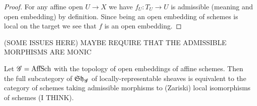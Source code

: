 \documentclass[12pt]{article}
\begin{document}
\begin{proof}
For any affine open $U \to X$ we have $f_U : T_U \to U$ is admissible (meaning and open embedding) by definition. Since being an open embedding of schemes is local on the target we see that $f$ is an open embedding.
\end{proof}

(SOME ISSUES HERE) MAYBE REQUIRE THAT THE ADMISSIBLE MORPHISMS ARE MONIC

\begin{prop}
Let $\mathscr{G} = \mathrm{AffSch}$ with the topology of open embeddings of affine schemes. Then the full subcategory of $\mathfrak{Sh}_{\mathscr{G}}$ of locally-representable sheaves is equivalent to the category of schemes taking admissible morphisms to (Zariski) local isomorphisms of schemes (I THINK). 
\end{prop}
\end{document}
